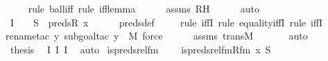 \begin{isabellebody}
\ \ \ \ \isamarkupfalse%
{\isacharparenleft}{\kern0pt}rule\ ball{\isacharunderscore}{\kern0pt}iff{\isacharcomma}{\kern0pt}\ rule\ iff{\isacharunderscore}{\kern0pt}lemma{\isacharparenright}{\kern0pt}\isanewline
\ \ \ \ \isamarkupfalse%
\ assms\ RH\isanewline
\ \ \ \ \isamarkupfalse%
\ auto\isanewline
\ \ \isamarkupfalse%
\ I{}\ {\isacharcolon}{\kern0pt}\ {\isachardoublequoteopen}{\isachardot}{\kern0pt}{\isachardot}{\kern0pt}{\isachardot}{\kern0pt}\ {\isasymlongleftrightarrow}\ S\ {\isacharequal}{\kern0pt}\ preds{\isacharparenleft}{\kern0pt}R{\isacharcomma}{\kern0pt}\ x{\isacharparenright}{\kern0pt}{\isachardoublequoteclose}\isanewline
\ \ \ \ \isamarkupfalse%
\ preds{\isacharunderscore}{\kern0pt}def\isanewline
\ \ \ \ \isamarkupfalse%
{\isacharparenleft}{\kern0pt}rule\ iffI{\isacharcomma}{\kern0pt}\ rule\ equality{\isacharunderscore}{\kern0pt}iffI{\isacharcomma}{\kern0pt}\ rule\ iffI{\isacharparenright}{\kern0pt}\isanewline
\ \ \ \ \ \ \isamarkupfalse%
{\isacharparenleft}{\kern0pt}rename{\isacharunderscore}{\kern0pt}tac\ y{\isacharcomma}{\kern0pt}\ subgoal{\isacharunderscore}{\kern0pt}tac\ {\isachardoublequoteopen}y\ {\isasymin}\ M{\isachardoublequoteclose}{\isacharcomma}{\kern0pt}\ force{\isacharparenright}{\kern0pt}\isanewline
\ \ \ \ \isamarkupfalse%
\ assms\ transM\ \isanewline
\ \ \ \ \isamarkupfalse%
\ auto\ \ \ \isanewline
\isanewline
\ \ \isamarkupfalse%
\ {\isacharquery}{\kern0pt}thesis\ \isamarkupfalse%
\ I{}\ I{}\ I{}\ \isamarkupfalse%
\ auto\isanewline
{}\isamarkupfalse%
%
\endisatagproof
{\isafoldproof}%
%
\isadelimproof
\isanewline
%
\endisadelimproof
\isanewline
{}\isamarkupfalse%
\isanewline
\isanewline
{}\isamarkupfalse%
\ is{\isacharunderscore}{\kern0pt}preds{\isacharunderscore}{\kern0pt}rel{\isacharunderscore}{\kern0pt}fm\ \ \isanewline
\ \ {\isachardoublequoteopen}is{\isacharunderscore}{\kern0pt}preds{\isacharunderscore}{\kern0pt}rel{\isacharunderscore}{\kern0pt}fm{\isacharparenleft}{\kern0pt}Rfm{\isacharcomma}{\kern0pt}\ x{\isacharcomma}{\kern0pt}\ S{\isacharparenright}{\kern0pt}\ {\isasymequiv}\ \isanewline

\end{isabellebody}
